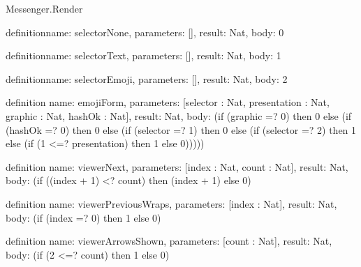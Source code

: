 \begin{lexlean}{Messenger.Render}
\begin{semanticmodule}
definition{name: selectorNone, parameters: [], result: Nat, body: 0}

definition{name: selectorText, parameters: [], result: Nat, body: 1}

definition{name: selectorEmoji, parameters: [], result: Nat, body: 2}

definition{
  name: emojiForm,
  parameters: [selector : Nat, presentation : Nat, graphic : Nat, hashOk : Nat],
  result: Nat,
  body: (if (graphic =? 0) then 0 else (if (hashOk =? 0) then 0 else (if (selector =? 1) then 0 else (if (selector =? 2) then 1 else (if (1 <=? presentation) then 1 else 0)))))
}

definition{
  name: viewerNext,
  parameters: [index : Nat, count : Nat],
  result: Nat,
  body: (if ((index + 1) <? count) then (index + 1) else 0)
}

definition{
  name: viewerPreviousWraps,
  parameters: [index : Nat],
  result: Nat,
  body: (if (index =? 0) then 1 else 0)
}

definition{
  name: viewerArrowsShown,
  parameters: [count : Nat],
  result: Nat,
  body: (if (2 <=? count) then 1 else 0)
}
\end{semanticmodule}
\end{lexlean}

